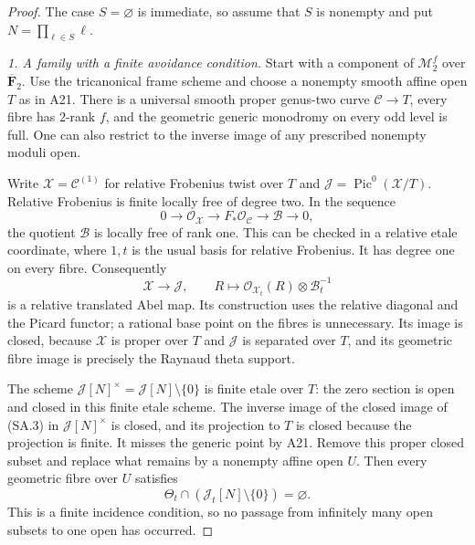 \documentclass[11pt,a4paper]{article}
\begin{document}
\begin{proof}
The case $S=\varnothing$ is immediate, so assume that $S$
is nonempty and put $N=\prod_{\ell\in S}\ell$.

\emph{1. A family with a finite avoidance condition.}
Start with a component of $\mathcal M_2^f$ over
$\overline{\mathbf F}_2$.  Use the tricanonical frame scheme
and choose a nonempty smooth affine open $T$ as in A21.
There is a universal smooth proper genus-two curve
$\mathcal C\to T$, every fibre has $2$-rank $f$, and the
geometric generic monodromy on every odd level is full.
One can also restrict to the inverse image of any
prescribed nonempty moduli open.

Write $\mathcal X=\mathcal C^{(1)}$ for relative Frobenius
twist over $T$ and
$\mathcal J=\operatorname{Pic}^0(\mathcal X/T)$.
Relative Frobenius is finite locally free of degree two.
In the sequence
\[
 0\longrightarrow\mathcal O_{\mathcal X}
  \longrightarrow F_*\mathcal O_{\mathcal C}
  \longrightarrow\mathcal B\longrightarrow0,                 \tag{SA.2}
\]
the quotient $\mathcal B$ is locally free of rank one.
This can be checked in a relative etale coordinate, where
$1,t$ is the usual basis for relative Frobenius.
It has degree one on every fibre.  Consequently
\[
 \mathcal X\longrightarrow\mathcal J,\qquad
 R\longmapsto\mathcal O_{\mathcal X_t}(R)
                         \otimes\mathcal B_t^{-1}             \tag{SA.3}
\]
is a relative translated Abel map.  Its construction uses
the relative diagonal and the Picard functor; a rational
base point on the fibres is unnecessary.  Its image is
closed, because $\mathcal X$ is proper over $T$ and
$\mathcal J$ is separated over $T$, and its geometric
fibre image is precisely the Raynaud theta support.

The scheme
$\mathcal J[N]^\times=\mathcal J[N]\setminus\{0\}$
is finite etale over $T$: the zero section is open and
closed in this finite etale scheme.  The inverse image
of the closed image of (SA.3) in
$\mathcal J[N]^\times$ is closed, and its projection to
$T$ is closed because the projection is finite.
It misses the generic point by A21.  Remove this proper
closed subset and replace what remains by a nonempty
affine open $U$.  Then every geometric fibre over $U$
satisfies
\[
                  \Theta_t\cap
                  (\mathcal J_t[N]\setminus\{0\})
                           =\varnothing.                     \tag{SA.4}
\]
This is a finite incidence condition, so no passage from
infinitely many open subsets to one open has occurred.


\end{proof}
\end{document}
